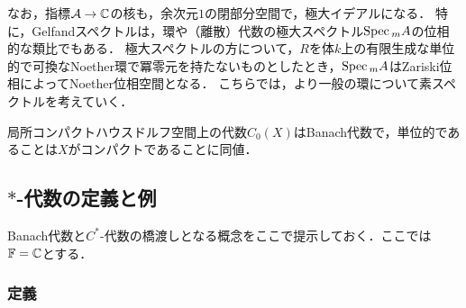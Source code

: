 \documentclass[uplatex,dvipdfmx]{jsreport}
\begin{document}
\begin{remark}[極大スペクトルとの関係]
    なお，指標$\mathcal{A}\to\mathbb{C}$の核も，余次元$1$の閉部分空間で，極大イデアルになる．
    特に，Gelfandスペクトルは，環や（離散）代数の極大スペクトル$\mathrm{Spec}\,_mA$の位相的な類比でもある．
    極大スペクトルの方について，$R$を体$k$上の有限生成な単位的で可換なNoether環で冪零元を持たないものとしたとき，$\mathrm{Spec}\,_mA$はZariski位相によってNoether位相空間となる．
    こちらでは，より一般の環について素スペクトルを考えていく．
\end{remark}

\begin{example}
    局所コンパクトハウスドルフ空間上の代数$C_0(X)$はBanach代数で，単位的であることは$X$がコンパクトであることに同値．
\end{example}

\subsection{$*$-代数の定義と例}

\begin{tcolorbox}[colframe=ForestGreen, colback=ForestGreen!10!white,breakable,colbacktitle=ForestGreen!40!white,coltitle=black,fonttitle=\bfseries\sffamily,
title=]
    Banach代数と$C^*$-代数の橋渡しとなる概念をここで提示しておく．ここでは$\mathbb{F}=\mathbb{C}$とする．
\end{tcolorbox}

\subsubsection{定義}
\end{document}
